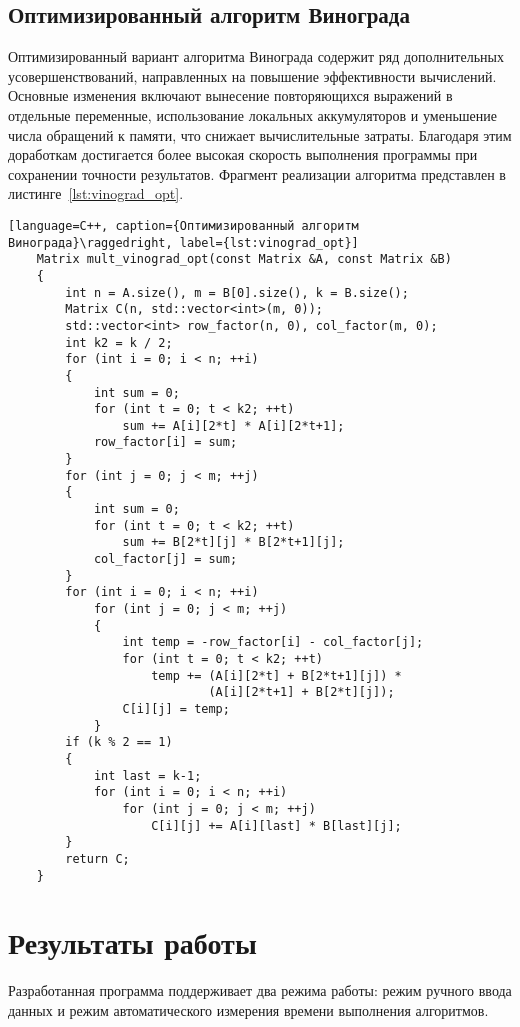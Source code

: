 \subsection{Оптимизированный алгоритм Винограда}

Оптимизированный вариант алгоритма Винограда содержит ряд дополнительных усовершенствований, направленных на повышение эффективности вычислений. Основные изменения включают вынесение повторяющихся выражений в отдельные переменные, использование локальных аккумуляторов и уменьшение числа обращений к памяти, что снижает вычислительные затраты. Благодаря этим доработкам достигается более высокая скорость выполнения программы при сохранении точности результатов. Фрагмент реализации алгоритма представлен в листинге~\ref{lst:vinograd_opt}.

\begin{lstlisting}[language=C++, caption={Оптимизированный алгоритм Винограда}\raggedright, label={lst:vinograd_opt}]
	Matrix mult_vinograd_opt(const Matrix &A, const Matrix &B) 
	{
	    int n = A.size(), m = B[0].size(), k = B.size();
	    Matrix C(n, std::vector<int>(m, 0));
	    std::vector<int> row_factor(n, 0), col_factor(m, 0);
	    int k2 = k / 2;
	    for (int i = 0; i < n; ++i) 
	    {
	        int sum = 0;
	        for (int t = 0; t < k2; ++t)
	            sum += A[i][2*t] * A[i][2*t+1];
	        row_factor[i] = sum;
	    }
	    for (int j = 0; j < m; ++j) 
	    {
	        int sum = 0;
	        for (int t = 0; t < k2; ++t)
	            sum += B[2*t][j] * B[2*t+1][j];
	        col_factor[j] = sum;
	    }
	    for (int i = 0; i < n; ++i)
	        for (int j = 0; j < m; ++j) 
	        {
	            int temp = -row_factor[i] - col_factor[j];
	            for (int t = 0; t < k2; ++t)
	                temp += (A[i][2*t] + B[2*t+1][j]) *
	                        (A[i][2*t+1] + B[2*t][j]);
	            C[i][j] = temp;
	        }
	    if (k % 2 == 1) 
	    {
	        int last = k-1;
	        for (int i = 0; i < n; ++i)
	            for (int j = 0; j < m; ++j)
	                C[i][j] += A[i][last] * B[last][j];
	    }
	    return C;
	}
\end{lstlisting}

\section{Результаты работы}

Разработанная программа поддерживает два режима работы: режим ручного ввода данных и режим автоматического измерения времени выполнения алгоритмов.  

